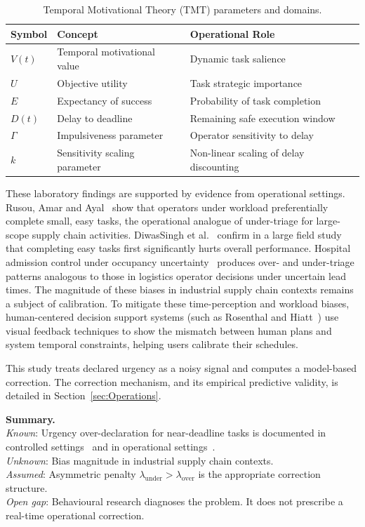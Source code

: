 \begin{table}[H]
\centering
\caption{Temporal Motivational Theory (TMT) parameters and domains.}
\label{tab:tmt_vars}
\begin{tabularx}{\linewidth}{llX}
\toprule
\textbf{Symbol} & \textbf{Concept} & \textbf{Operational Role} \\
\midrule
$V(t)$ & Temporal motivational value & Dynamic task salience \\
$U$ & Objective utility & Task strategic importance \\
$E$ & Expectancy of success & Probability of task completion \\
$D(t)$ & Delay to deadline & Remaining safe execution window \\
$\Gamma$ & Impulsiveness parameter & Operator sensitivity to delay \\
$k$ & Sensitivity scaling parameter & Non-linear scaling of delay discounting \\
\bottomrule
\end{tabularx}
\end{table}

These laboratory findings are supported by evidence from operational settings.
Rusou, Amar and Ayal~\autocite{rusou2020psychology} show that operators under workload
preferentially complete small, easy tasks, the operational analogue of under-triage for
large-scope supply chain activities. DiwasSingh et al.~\autocite{diwa2020task} confirm
in a large field study that completing easy tasks first significantly hurts overall
performance. Hospital admission control under occupancy uncertainty~\autocite{kim2020admission}
produces over- and under-triage patterns analogous to those in logistics operator
decisions under uncertain lead times. The magnitude of these biases in industrial supply chain contexts remains a subject of calibration. To mitigate these time-perception and workload biases, human-centered decision support systems (such as Rosenthal and Hiatt~\autocite{rosenthal2020human}) use visual feedback techniques to show the mismatch between human plans and system temporal constraints, helping users calibrate their schedules.

This study treats declared urgency as a noisy signal and computes a model-based
correction. The correction mechanism, and its empirical predictive validity, is detailed in Section~\ref{sec:Operations}.

\medskip
\noindent\textbf{Summary.} \\
\textit{Known}: Urgency over-declaration for near-deadline tasks is documented in
controlled settings~\autocite{zhu2018mere} and in operational
settings~\autocite{diwa2020task,rusou2020psychology}. \\
\textit{Unknown}: Bias magnitude in industrial supply chain contexts. \\
\textit{Assumed}: Asymmetric penalty $\lambda_{\text{under}} > \lambda_{\text{over}}$
is the appropriate correction structure. \\
\textit{Open gap}: Behavioural research diagnoses the problem. It does not prescribe a
real-time operational correction.

